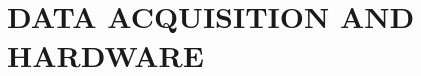 \documentclass[a4paper,twoside]{article}
\begin{document}





\section{\uppercase{Data Acquisition and Hardware}}
\label{sec:data}

\end{document}
